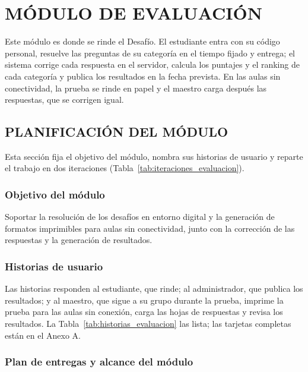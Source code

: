 \chapter{MÓDULO DE EVALUACIÓN}

Este módulo es donde se rinde el Desafío. El estudiante entra con su código personal, resuelve las preguntas de su categoría en el tiempo fijado y entrega; el sistema corrige cada respuesta en el servidor, calcula los puntajes y el ranking de cada categoría y publica los resultados en la fecha prevista. En las aulas sin conectividad, la prueba se rinde en papel y el maestro carga después las respuestas, que se corrigen igual.

\section{PLANIFICACIÓN DEL MÓDULO}

Esta sección fija el objetivo del módulo, nombra sus historias de usuario y reparte el trabajo en dos iteraciones (Tabla~\ref{tab:iteraciones_evaluacion}).

\subsection{Objetivo del módulo}

Soportar la resolución de los desafíos en entorno digital y la generación de formatos imprimibles para aulas sin conectividad, junto con la corrección de las respuestas y la generación de resultados.

\subsection{Historias de usuario}

Las historias responden al estudiante, que rinde; al administrador, que publica los resultados; y al maestro, que sigue a su grupo durante la prueba, imprime la prueba para las aulas sin conexión, carga las hojas de respuestas y revisa los resultados. La Tabla~\ref{tab:historias_evaluacion} las lista; las tarjetas completas están en el Anexo A.

{\estilotabla
}

\subsection{Plan de entregas y alcance del módulo}

